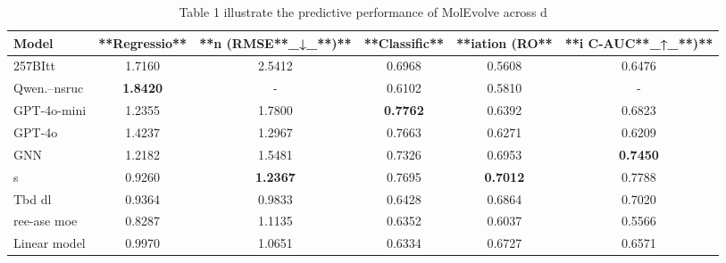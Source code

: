 \begin{table}[t]
\centering
\caption{Table 1 illustrate the predictive performance of MolEvolve across d}
\label{tab:2603.24382}
\begin{tabular}{lccccc}
\toprule
Model & **Regressio** & **n (RMSE**\_↓\_**)** & **Classific** & **iation (RO** & **i C-AUC**\_↑\_**)** \\
\midrule
257BItt & 1.7160 & 2.5412 & 0.6968 & 0.5608 & 0.6476 \\
Qwen.--nsruc & \textbf{1.8420} & - & 0.6102 & 0.5810 & - \\
GPT-4o-mini & 1.2355 & 1.7800 & \textbf{0.7762} & 0.6392 & 0.6823 \\
GPT-4o & 1.4237 & 1.2967 & 0.7663 & 0.6271 & 0.6209 \\
GNN & 1.2182 & 1.5481 & 0.7326 & 0.6953 & \textbf{0.7450} \\
s & 0.9260 & \textbf{1.2367} & 0.7695 & \textbf{0.7012} & 0.7788 \\
Tbd dl & 0.9364 & 0.9833 & 0.6428 & 0.6864 & 0.7020 \\
ree-ase moe & 0.8287 & 1.1135 & 0.6352 & 0.6037 & 0.5566 \\
Linear model & 0.9970 & 1.0651 & 0.6334 & 0.6727 & 0.6571 \\
\bottomrule
\end{tabular}
\end{table}

